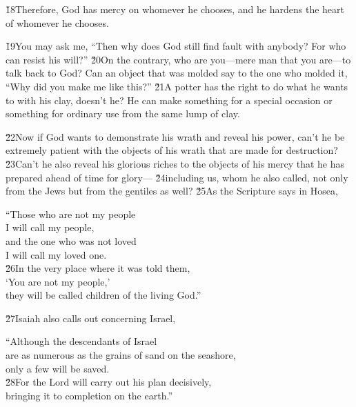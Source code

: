 \v{18}Therefore, God has mercy on whomever he chooses, and he hardens the heart of whomever he chooses.

\v{19}You may ask me, ``Then why does God still find fault with anybody? For who can resist his will?'' \v{20}On the contrary, who are you---mere man that you are---to talk back to God? Can an object that was molded say to the one who molded it, ``Why did you make me like this?'' \v{21}A potter has the right to do what he wants to with his clay, doesn't he? He can make something for a special occasion or something for ordinary use from the same lump of clay.

\v{22}Now if God wants to demonstrate his wrath and reveal his power, can't he be extremely patient with the objects of his wrath that are made for destruction? \v{23}Can't he also reveal his glorious riches to the objects of his mercy that he has prepared ahead of time for glory--- \v{24}including us, whom he also called, not only from the Jews but from the gentiles as well? \v{25}As the Scripture says in Hosea,

\begin{poetry}
\poeml ``Those who are not my people \\
\poemll    I will call my people, \\
\poeml and the one who was not loved \\
\poemll    I will call my loved one. \\
\poeml \v{26}In the very place where it was told them, \\
\poemll    `You are not my people,' \\
\poemlll       they will be called children of the living God.''
\end{poetry}

\v{27}Isaiah also calls out concerning Israel,

\begin{poetry}
\poeml ``Although the descendants of Israel \\
\poemll    are as numerous as the grains of sand on the seashore, \\
\poemlll       only a few will be saved. \\
\poeml \v{28}For the Lord will carry out his plan decisively, \\
\poemll    bringing it to completion on the earth.''
\end{poetry}

